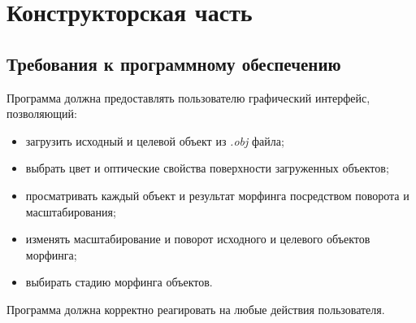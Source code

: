 \chapter{Конструкторская часть}


\section{Требования к программному обеспечению}
Программа должна предоставлять пользователю графический интерфейс, позволяющий:
\begin{itemize}
    \item загрузить исходный и целевой объект из \textit{.obj} файла;
    \item выбрать цвет и оптические свойства поверхности загруженных объектов;
    \item просматривать каждый объект и результат морфинга посредством поворота и масштабирования;
    \item изменять масштабирование и поворот исходного и целевого объектов морфинга;
    \item выбирать стадию морфинга объектов.
\end{itemize}

Программа должна корректно реагировать на любые действия пользователя.


